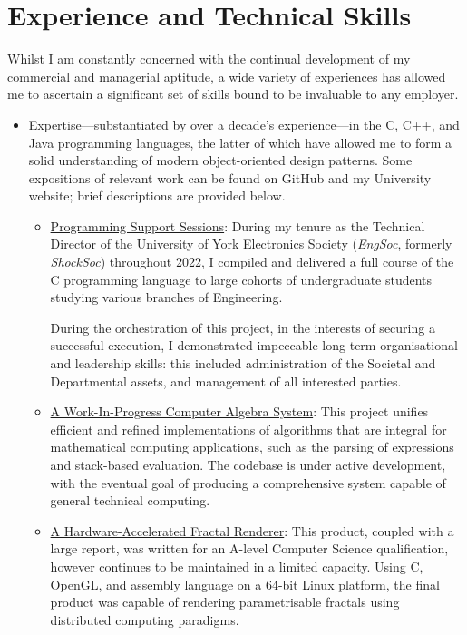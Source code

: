 \documentclass{article}
\newcommand\githublink[2]{\href{https://github.com/oliverdixon/#1}{#2}}
\newcommand\weblink[2]{\href{https://www-users.york.ac.uk/~od641/#1}{#2}}
\begin{document}
\section{Experience and Technical Skills}
Whilst I am constantly concerned with the continual development of my commercial
and managerial aptitude, a wide variety of experiences has allowed me to
ascertain a significant set of skills bound to be invaluable to any employer.
\begin{itemize}
    \item Expertise---substantiated by over a decade's experience---in the C,
        C++, and Java programming languages, the latter of which have allowed me
        to form a solid understanding of modern object-oriented design patterns.
        Some expositions of relevant work can be found on GitHub and my
        University website; brief descriptions are provided below.
    \begin{itemize}
        \item \weblink{pss}{Programming Support Sessions}: During my tenure as
        the Technical Director of the University of York Electronics Society
        (\textit{EngSoc}, formerly \textit{ShockSoc}) throughout 2022, I
        compiled and delivered a full course of the C programming language to
        large cohorts of undergraduate students studying various branches of
        Engineering.

        During the orchestration of this project, in the interests of securing a
        successful execution, I demonstrated impeccable long-term organisational
        and leadership skills: this included administration of the Societal and
        Departmental assets, and management of all interested parties.

        \item \githublink{calculator-demo}{A Work-In-Progress Computer Algebra
        System}: This project unifies efficient and refined implementations of
        algorithms that are integral for mathematical computing applications,
        such as the parsing of expressions and stack-based evaluation. The
        codebase is under active development, with the eventual goal of
        producing a comprehensive system capable of general technical computing.

        \item \weblink{fractal}{A Hardware-Accelerated Fractal Renderer}: This
        product, coupled with a large report, was written for an A-level
        Computer Science qualification, however continues to be maintained in a
        limited capacity. Using C, OpenGL, and assembly language on a 64-bit
        Linux platform, the final product was capable of rendering
        parametrisable fractals using distributed computing paradigms.


\end{itemize}
\end{itemize}
\end{document}
